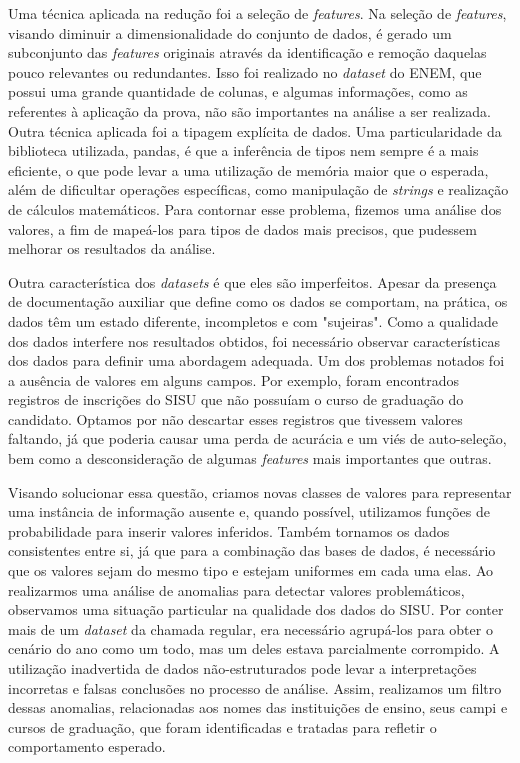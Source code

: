 Uma técnica aplicada na redução foi a seleção de \textit{features}. Na seleção de \textit{features}, visando diminuir a dimensionalidade
 do conjunto de dados, é gerado um subconjunto das \textit{features} originais através da identificação e remoção daquelas pouco relevantes
ou redundantes. Isso foi realizado no \textit{dataset} do ENEM, que possui uma grande quantidade de colunas, e algumas informações, 
como as referentes à aplicação da prova, não são importantes na análise a ser realizada. 
Outra técnica aplicada foi a tipagem explícita de dados. Uma particularidade da biblioteca utilizada, pandas, é que a inferência de tipos 
nem sempre é a mais eficiente, o que pode levar a uma utilização de memória maior que o esperada, além de dificultar operações específicas, 
como manipulação de \textit{strings} e realização de cálculos matemáticos. Para contornar esse problema, fizemos uma análise dos valores, a fim de mapeá-los
para tipos de dados mais precisos, que pudessem melhorar os resultados da análise.

Outra característica dos \textit{datasets} é que eles são imperfeitos. Apesar da presença de documentação auxiliar que define como os dados se comportam, na prática, os dados têm um estado diferente, incompletos e com "sujeiras". Como a qualidade dos dados interfere nos resultados obtidos, foi necessário observar características dos dados para definir uma abordagem adequada.
Um dos problemas notados foi a ausência de valores em alguns campos. Por exemplo, foram encontrados registros de inscrições do SISU que não possuíam o curso de graduação do candidato. Optamos por não descartar esses registros que tivessem valores faltando, já que poderia causar uma perda de acurácia e um viés de auto-seleção, bem como a desconsideração de algumas \textit{features} mais importantes que outras. 

Visando solucionar essa questão, criamos novas classes de valores para representar uma instância de informação ausente e, quando possível, utilizamos funções de probabilidade para inserir valores inferidos. Também tornamos os dados consistentes entre si, já que para a combinação das bases de dados, é necessário que os valores sejam do mesmo tipo e estejam uniformes em cada uma elas. Ao realizarmos uma análise de anomalias para detectar valores problemáticos, observamos uma situação particular na qualidade dos dados do SISU. Por conter mais de um \textit{dataset} da chamada regular, era necessário agrupá-los para obter o cenário do ano como um todo, mas um deles estava parcialmente corrompido. A utilização inadvertida de dados não-estruturados pode levar a interpretações incorretas e falsas conclusões no processo de análise. Assim, realizamos um filtro dessas anomalias, relacionadas aos nomes das instituições de ensino, seus campi e cursos de graduação, que foram identificadas e tratadas para refletir o comportamento esperado. 


